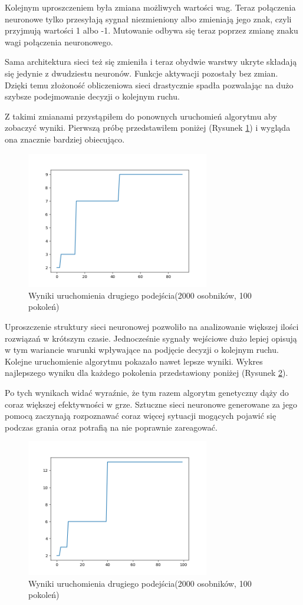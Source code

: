 \documentclass[12pt, oneside, a4paper]{report}
\begin{document}
Kolejnym uproszczeniem była zmiana możliwych wartości wag. Teraz połączenia neuronowe tylko przesyłają sygnał niezmieniony albo zmieniają jego znak, czyli przyjmują wartości 1 albo -1. Mutowanie odbywa się teraz poprzez zmianę znaku wagi połączenia neuronowego.

Sama architektura sieci też się zmieniła i teraz obydwie warstwy ukryte składają się jedynie z dwudziestu neuronów. Funkcje aktywacji pozostały bez zmian. Dzięki temu złożoność obliczeniowa sieci drastycznie spadła pozwalając na dużo szybsze podejmowanie decyzji o kolejnym ruchu.

Z takimi zmianami przystąpiłem do ponownych uruchomień algorytmu aby zobaczyć wyniki. Pierwszą próbę przedstawiłem poniżej (Rysunek \ref{fig: 4.3}) i wygląda ona znacznie bardziej obiecująco.

\begin{figure}[h]
	\centering
	\includegraphics[width=8cm]{fig43.png}
	\caption{Wyniki uruchomienia drugiego podejścia(2000 osobników, 100 pokoleń) }
	\label{fig: 4.3}
\end{figure}

Uproszczenie struktury sieci neuronowej pozwoliło na analizowanie większej ilości rozwiązań w krótszym czasie. Jednocześnie sygnały wejściowe dużo lepiej opisują w tym wariancie warunki wpływające na podjęcie decyzji o kolejnym ruchu. Kolejne uruchomienie algorytmu pokazało nawet lepsze wyniki. Wykres najlepszego wyniku dla każdego pokolenia przedstawiony poniżej (Rysunek \ref{fig: 4.4}).

Po tych wynikach widać wyraźnie, że tym razem algorytm genetyczny dąży do coraz większej efektywności w grze. Sztuczne sieci neuronowe generowane za jego pomocą zaczynają rozpoznawać coraz więcej sytuacji mogących pojawić się podczas grania oraz potrafią na nie poprawnie zareagować.

\begin{figure}[h]
	\centering
	\includegraphics[width=8cm]{fig44.png}
	\caption{Wyniki uruchomienia drugiego podejścia(2000 osobników, 100 pokoleń)}
	\label{fig: 4.4}
\end{figure}
 
\end{document}
